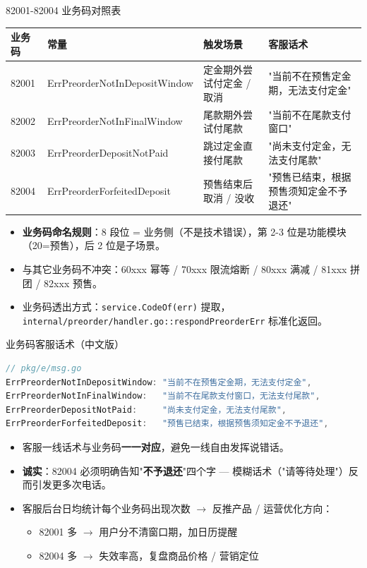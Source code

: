 \documentclass[aspectratio=169,11pt]{beamer}
\begin{document}
\begin{frame}[shrink]{82001-82004 业务码对照表}
{\footnotesize
\begin{tabular}{@{}llp{5.5cm}p{3cm}@{}}
\toprule
业务码 & 常量 & 触发场景 & 客服话术 \\
\midrule
82001 & ErrPreorderNotInDepositWindow & 定金期外尝试付定金 / 取消 & "当前不在预售定金期，无法支付定金" \\
82002 & ErrPreorderNotInFinalWindow   & 尾款期外尝试付尾款       & "当前不在尾款支付窗口" \\
82003 & ErrPreorderDepositNotPaid     & 跳过定金直接付尾款       & "尚未支付定金，无法支付尾款" \\
82004 & ErrPreorderForfeitedDeposit   & 预售结束后取消 / 没收     & "预售已结束，根据预售须知定金不予退还" \\
\bottomrule
\end{tabular}}
\vspace{2mm}
\begin{itemize}\small
  \item \textbf{业务码命名规则}：8 段位 = 业务侧（不是技术错误），第 2-3 位是功能模块（20=预售），后 2 位是子场景。
  \item 与其它业务码不冲突：60xxx 幂等 / 70xxx 限流熔断 / 80xxx 满减 / 81xxx 拼团 / 82xxx 预售。
  \item 业务码透出方式：\texttt{service.CodeOf(err)} 提取，\texttt{internal/preorder/handler.go::respondPreorderErr} 标准化返回。
\end{itemize}
\end{frame}

\begin{frame}{业务码客服话术（中文版）}
\begin{lstlisting}[language=Go]
// pkg/e/msg.go
ErrPreorderNotInDepositWindow: "当前不在预售定金期，无法支付定金",
ErrPreorderNotInFinalWindow:   "当前不在尾款支付窗口，无法支付尾款",
ErrPreorderDepositNotPaid:     "尚未支付定金，无法支付尾款",
ErrPreorderForfeitedDeposit:   "预售已结束，根据预售须知定金不予退还",
\end{lstlisting}
\vspace{1mm}
\begin{itemize}\small
  \item 客服一线话术与业务码\textbf{一一对应}，避免一线自由发挥说错话。
  \item \textbf{诚实}：82004 必须明确告知"\textbf{不予退还}"四个字 — 模糊话术（"请等待处理"）反而引发更多次电话。
  \item 客服后台日均统计每个业务码出现次数 $\to$ 反推产品 / 运营优化方向：
    \begin{itemize}\footnotesize
      \item 82001 多 $\to$ 用户分不清窗口期，加日历提醒
      \item 82004 多 $\to$ 失效率高，复盘商品价格 / 营销定位
    \end{itemize}
\end{itemize}
\end{frame}
\end{document}
